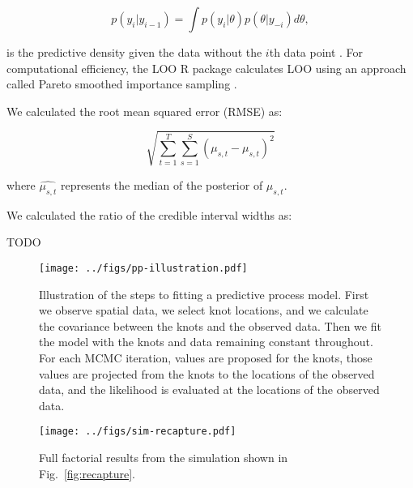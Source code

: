 \documentclass[12pt,english]{article}
\begin{document}
\begin{equation}
  p(y_i | y_{i-1}) = \int p(y_i | \theta) p (\theta | y_{-i}) d \theta ,
\end{equation}

\noindent is the predictive density given the data without the $i$th data
point \citep{vehtari2016}. For computational efficiency, the LOO R package
calculates LOO using an approach called Pareto smoothed importance sampling
\citep{vehtari2016}.

We calculated the root mean squared error (RMSE) as:

\begin{equation}
  \sqrt{ \sum^{T}_{t=1}{ \sum^{S}_{s=1}{ (\mu_{s,t} - \widehat{ \mu_{s,t} })^2 } } }
\end{equation}

\noindent where $\widehat{\mu_{s,t}}$ represents the median of the posterior
of $\mu_{s,t}$.

We calculated the ratio of the credible interval widths as:

TODO

\renewcommand{\thefigure}{S\arabic{figure}}
\renewcommand{\thetable}{S\arabic{table}}
\setcounter{figure}{0}
\setcounter{table}{0}

\begin{figure}[htb]
  \begin{center}
    \texttt{[image: ../figs/pp-illustration.pdf]}
    \caption{
      Illustration of the steps to fitting a predictive process model.
      First we observe spatial data, we select knot locations,
      and we calculate the covariance between the knots and the observed data.
      Then we fit the model with the knots and data remaining constant throughout.
      For each MCMC iteration, values are proposed for the
      knots, those values are projected from the knots to the locations of the observed data,
      and the likelihood is evaluated at the locations of the observed data.}
    \label{fig:didactic}
  \end{center}
\end{figure}

\clearpage

\begin{figure}[htb]
  \begin{center}
    \texttt{[image: ../figs/sim-recapture.pdf]}
    \caption{
      Full factorial results from the simulation shown in Fig.~\ref{fig:recapture}.
    }
    \label{fig:recapture-factorial}
  \end{center}
\end{figure}
\end{document}
